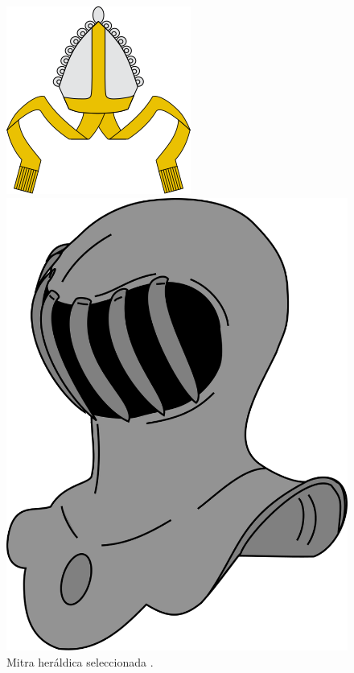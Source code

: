 \begin{itemize}
\begin{figure}[h!]
\begin{minipage}{0.3\textwidth}
        \includegraphics[width=\textwidth]{figuras/mitra.png}
        \caption{Mitra heráldica seleccionada \cite{mitra_wikipedia}.}
    \end{minipage}
    \hfill
    \begin{minipage}{0.3\textwidth}
        \centering
        \includegraphics[width=\textwidth]{figuras/yelmo.png}

\end{minipage}
\end{figure}
\end{itemize}
